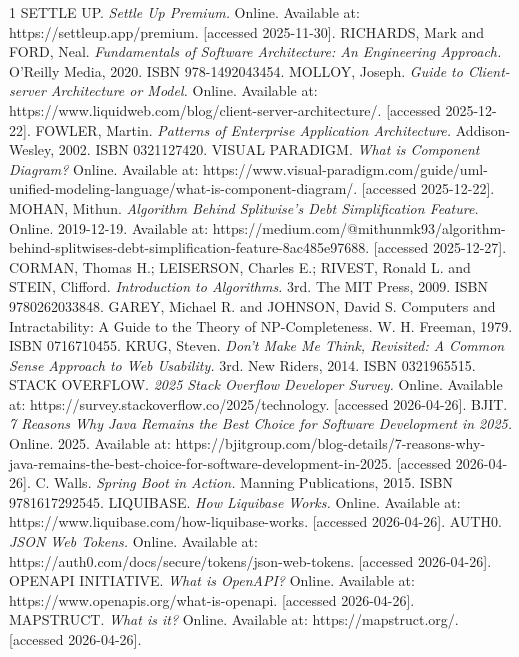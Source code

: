 \documentclass{ctuthesis}
\begin{document}
\begin{thebibliography}{1}
 SETTLE UP. \emph{Settle Up Premium.} Online. Available at: https://settleup.app/premium. [accessed 2025-11-30].
 RICHARDS, Mark and FORD, Neal. \emph{Fundamentals of Software Architecture: An Engineering Approach.} O'Reilly Media, 2020. ISBN 978-1492043454.
 MOLLOY, Joseph. \emph{Guide to Client-server Architecture or Model.} Online. Available at: https://www.liquidweb.com/blog/client-server-architecture/. [accessed 2025-12-22].
 FOWLER, Martin. \emph{Patterns of Enterprise Application Architecture.} Addison-Wesley, 2002. ISBN 0321127420.
 VISUAL PARADIGM. \emph{What is Component Diagram?} Online. Available at: https://www.visual-paradigm.com/guide/uml-unified-modeling-language/what-is-component-diagram/. [accessed 2025-12-22].
 MOHAN, Mithun. \emph{Algorithm Behind Splitwise’s Debt Simplification Feature.} Online. 2019-12-19. Available at: https://medium.com/@mithunmk93/algorithm-behind-splitwises-debt-simplification-feature-8ac485e97688. [accessed 2025-12-27].
 CORMAN, Thomas H.; LEISERSON, Charles E.; RIVEST, Ronald L. and STEIN, Clifford. \emph{Introduction to Algorithms.} 3rd. The MIT Press, 2009. ISBN 9780262033848.
 GAREY, Michael R. and JOHNSON, David S. Computers and Intractability: A Guide to the Theory of NP-Completeness. W. H. Freeman, 1979. ISBN 0716710455.
 KRUG, Steven. \emph{Don’t Make Me Think, Revisited: A Common Sense Approach to Web Usability.} 3rd. New Riders, 2014. ISBN 0321965515.
 STACK OVERFLOW. \emph{2025 Stack Overflow Developer Survey.} Online. Available at: https://survey.stackoverflow.co/2025/technology. [accessed 2026-04-26].
 BJIT. \emph{7 Reasons Why Java Remains the Best Choice for Software Development in 2025.} Online. 2025. Available at: https://bjitgroup.com/blog-details/7-reasons-why-java-remains-the-best-choice-for-software-development-in-2025. [accessed 2026-04-26].
 C. Walls. \emph{Spring Boot in Action.} Manning Publications,
2015. ISBN 9781617292545.
 LIQUIBASE. \emph{How Liquibase Works.} Online. Available at: https://www.liquibase.com/how-liquibase-works. [accessed 2026-04-26].
 AUTH0. \emph{JSON Web Tokens.} Online. Available at: https://auth0.com/docs/secure/tokens/json-web-tokens. [accessed 2026-04-26].
 OPENAPI INITIATIVE. \emph{What is OpenAPI?} Online. Available at: https://www.openapis.org/what-is-openapi. [accessed 2026-04-26].
 MAPSTRUCT. \emph{What is it?} Online. Available at: https://mapstruct.org/. [accessed 2026-04-26].

\end{thebibliography}
\end{document}
